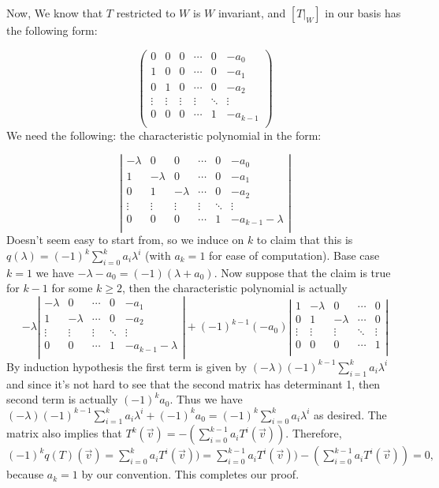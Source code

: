\documentclass[11pt]{article}
\begin{document}
\begin{enumerate}
Now, We know that $T$ restricted to $W$ is $W$ invariant, and $[T|_W]$ in our basis has the following form: 

\[
\left(
\begin{array}{cccccc}
0 & 0 & 0 & \cdots & 0 & -a_0\\
1 & 0 & 0 & \cdots & 0 & -a_1\\
0 & 1 & 0 & \cdots & 0 & -a_2\\
\vdots & \vdots & \vdots & \vdots & \ddots & \vdots\\
0 & 0 & 0 & \cdots & 1 & -a_{k-1}\\
\end{array}
\right)
\]
We need the following: the characteristic polynomial in the form: 

\[
\left |
\begin{array}{cccccc}
-\lambda & 0 & 0 & \cdots & 0 & -a_0\\
1 & -\lambda & 0 & \cdots & 0 & -a_1\\
0 & 1 & -\lambda & \cdots & 0 & -a_2\\
\vdots & \vdots & \vdots & \vdots & \ddots & \vdots\\
0 & 0 & 0 & \cdots & 1 & -a_{k-1}-\lambda\\
\end{array}
\right |
\]
Doesn't seem easy to start from, so we induce on $k$ to claim that this is 
$q(\lambda)=(-1)^k\displaystyle\sum_{i=0}^k a_i\lambda^i$ (with $a_k = 1$ for ease of computation). 
Base case $k=1$ we have 
$-\lambda-a_0 = (-1)(\lambda + a_0)$. 
Now suppose that the claim is true for $k-1$ for some $k\ge 2$, then the characteristic polynomial is actually 
\[-\lambda
\left |
\begin{array}{ccccc}
-\lambda & 0 & \cdots & 0 & -a_1\\
1 & -\lambda & \cdots & 0 & -a_2\\
\vdots & \vdots & \vdots & \ddots & \vdots\\
0 & 0 & \cdots & 1 & -a_{k-1}-\lambda\\
\end{array}
\right |
+
(-1)^{k-1}(-a_0)
\left |
\begin{array}{ccccc}
1 & -\lambda & 0 & \cdots & 0\\
0 & 1 & -\lambda & \cdots & 0\\
\vdots & \vdots & \vdots & \ddots & \vdots\\
0 & 0 & 0 & \cdots & 1\\
\end{array}
\right |
\]
By induction hypothesis the first term is given by 
$(-\lambda)(-1)^{k-1}\displaystyle\sum_{i=1}^k a_i\lambda^i$ and 
since it's not hard to see that the second matrix has determinant 1, then second term is actually $(-1)^ka_0$. 
Thus we have 
$(-\lambda)(-1)^{k-1}\displaystyle\sum_{i=1}^k a_i\lambda^i+(-1)^ka_0
=(-1)^k\displaystyle\sum_{i=0}^k a_i\lambda^i
$
as desired. 
The matrix also implies that $T^k(\vec{v})=-(\displaystyle\sum_{i=0}^{k-1} a_iT^{i}(\vec{v}))$. 
Therefore, 
$(-1)^kq(T)(\vec{v})
=\displaystyle\sum_{i=0}^k a_iT^{i}(\vec{v}))
=\displaystyle\sum_{i=0}^{k-1} a_iT^{i}(\vec{v}))-(\displaystyle\sum_{i=0}^{k-1} a_iT^{i}(\vec{v}))
=0, 
$
because $a_k=1$ by our convention. 
This completes our proof. 


\end{enumerate}
\end{document}
